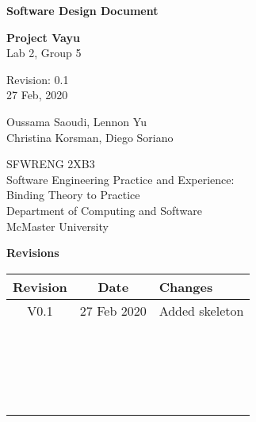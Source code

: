 \documentclass[12pt]{article}
\begin{document}
\begin{titlepage}
    \begin{center}
        \vspace*{1cm}
            
        \Huge
        \textbf{Software Design Document}

        \LARGE
        \vspace{0.5cm}
        \textbf{Project Vayu}\\
        \vspace{0.2cm}
        Lab 2, Group 5

        \vspace{0.5cm}
        Revision: 0.1\\
        \vspace{0.2cm}
        27 Feb, 2020
            
        \vspace{1.5cm}
            
        \Large
        Oussama Saoudi, Lennon Yu\\
        Christina Korsman, Diego Soriano

        \vfill
            
        \vspace{0.8cm}
                        
        \large
        SFWRENG 2XB3\\
        Software Engineering Practice and Experience:\\
        Binding Theory to Practice\\
        Department of Computing and Software\\
        McMaster University            
    \end{center}
\end{titlepage}

\newpage
\Large \noindent \textbf{Revisions}\\
\normalsize
\begin{center}
    \begin{tabular}{|| c | c | p{7cm} ||} 
    \hline
    Revision & Date & Changes\\
    \hline\hline
    V0.1 & 27 Feb 2020 & Added skeleton \\ 
    \hline
    ~ & ~ & ~ \\
    \hline
    ~ & ~ & ~ \\
    \hline
    ~ & ~ & ~ \\
    \hline
    ~ & ~ & ~ \\
    \hline
\end{tabular}
\end{center}
\end{document}
